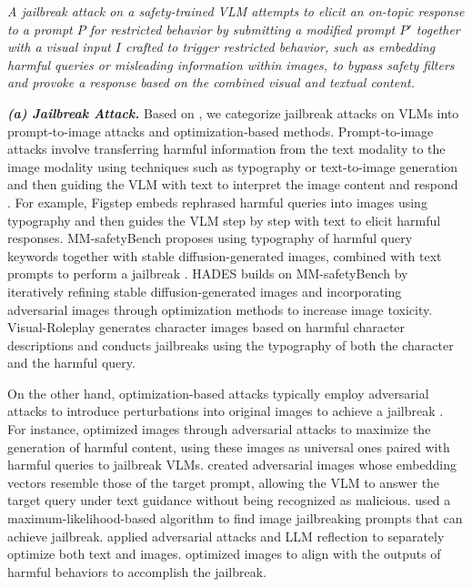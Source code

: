 \begin{tcolorbox}[definition]
\textit{A jailbreak attack on a safety-trained VLM attempts to elicit an on-topic response to a prompt $P$ for restricted behavior by submitting a modified prompt $P'$ together with a visual input $I$ crafted to trigger restricted behavior, such as embedding harmful queries or misleading information within images, to bypass safety filters and provoke a response based on the combined visual and textual content.}
\end{tcolorbox}

\textbf{\textit{(a) Jailbreak Attack.}} 
Based on \cite{weng2024textit, jin2024jailbreakzoosurveylandscapeshorizons}, we categorize jailbreak attacks on VLMs into prompt-to-image attacks and optimization-based methods. Prompt-to-image attacks involve transferring harmful information from the text modality to the image modality using techniques such as typography or text-to-image generation and then guiding the VLM with text to interpret the image content and respond \cite{gong2023figstep, liu2024mmsafetybenchbenchmarksafetyevaluation, ma2024visual, li2024images}. For example, Figstep \cite{gong2023figstep} embeds rephrased harmful queries into images using typography and then guides the VLM step by step with text to elicit harmful responses. MM-safetyBench \cite{rombach2022high} proposes using typography of harmful query keywords together with stable diffusion-generated images, combined with text prompts to perform a jailbreak \cite{liu2024mmsafetybenchbenchmarksafetyevaluation}. HADES \cite{li2024images} builds on MM-safetyBench by iteratively refining stable diffusion-generated images and incorporating adversarial images through optimization methods to increase image toxicity. Visual-Roleplay  \cite{ma2024visual} generates character images based on harmful character descriptions and conducts jailbreaks using the typography of both the character and the harmful query.

On the other hand, optimization-based attacks typically employ adversarial attacks to introduce perturbations into original images to achieve a jailbreak \cite{qi2023visual, shayegani2023jailbreak, niu2024jailbreaking, ying2024jailbreak, bailey2023image, dong2023robust}. For instance, \cite{qi2023visual} optimized images through adversarial attacks to maximize the generation of harmful content, using these images as universal ones paired with harmful queries to jailbreak VLMs. \cite{shayegani2023jailbreak} created adversarial images whose embedding vectors resemble those of the target prompt, allowing the VLM to answer the target query under text guidance without being recognized as malicious. \cite{niu2024jailbreaking} used a maximum-likelihood-based algorithm to find image jailbreaking prompts that can achieve jailbreak. \cite{ying2024jailbreak} applied adversarial attacks and LLM reflection \cite{shinn2024reflexion} to separately optimize both text and images. \cite{bailey2023image} optimized images to align with the outputs of harmful behaviors to accomplish the jailbreak.

